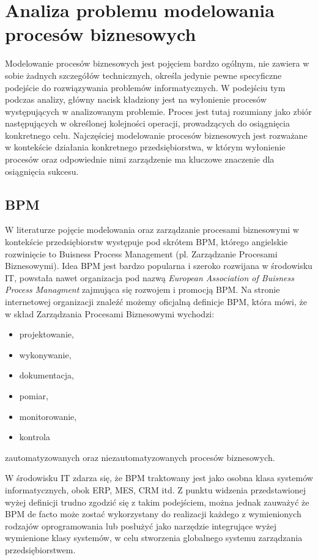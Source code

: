 \chapter{Analiza problemu modelowania procesów biznesowych}
\label{cha:analizaModelowaniaProcesowBiznesowych}

Modelowanie procesów biznesowych jest pojęciem bardzo ogólnym, nie zawiera w sobie żadnych szczegółów technicznych, określa jedynie pewne specyficzne podejście do rozwiązywania problemów informatycznych. W podejściu tym podczas analizy, główny nacisk kładziony jest na wyłonienie procesów występujących w analizowanym problemie. Proces jest tutaj rozumiany jako zbiór następujących w określonej kolejności operacji, prowadzących do osiągnięcia konkretnego celu. Najczęściej modelowanie procesów biznesowych jest rozważane w kontekście działania konkretnego przedsiębiorstwa, w którym wyłonienie procesów oraz odpowiednie nimi zarządzenie ma kluczowe znaczenie dla osiągnięcia sukcesu. 


\section{BPM}
\label{sec:bpm}

W literaturze pojęcie modelowania oraz zarządzanie procesami biznesowymi w kontekście przedsiębiorstw występuje pod skrótem BPM, którego angielskie rozwinięcie to Buisness Process Management (pl.  Zarządzanie Procesami Biznesowymi). Idea BPM jest bardzo popularna i szeroko rozwijana w środowisku IT, powstała nawet organizacja pod nazwą \textit{European Association of Buisness Process Managment} zajmująca się rozwojem i promocją BPM.  Na stronie internetowej organizacji znaleźć możemy oficjalną definicje BPM, która mówi, że w skład Zarządzania Procesami Biznesowymi wychodzi:
\begin{itemize}
\item projektowanie,
\item wykonywanie,
\item dokumentacja,
\item pomiar,
\item monitorowanie,
\item kontrola
\end{itemize}
zautomatyzowanych oraz niezautomatyzowanych procesów biznesowych.~\cite{EAOBPMWeb}

W środowisku IT zdarza się, że BPM traktowany jest jako osobna klasa systemów informatycznych, obok ERP, MES, CRM itd. Z punktu widzenia przedstawionej wyżej definicji trudno zgodzić się z takim podejściem, można jednak zauważyć że BPM de facto może zostać wykorzystany do realizacji każdego z wymienionych rodzajów oprogramowania lub posłużyć jako narzędzie integrujące wyżej wymienione klasy systemów, w celu stworzenia globalnego systemu zarządzania przedsiębiorstwem. ~\cite{wiBPMA}

